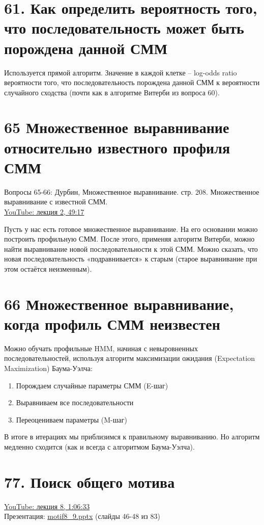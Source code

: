 \documentclass[a4paper,12pt]{article} %
\begin{document}
\section{61. Как определить вероятность того, что последовательность может быть порождена данной СММ}
Используется прямой алгоритм. Значение в каждой клетке -- log-odds ratio вероятности того, что последовательность порождена данной СММ к вероятности случайного сходства (почти как в алгоритме Витерби из вопроса 60).


\section{65 Множественное выравнивание относительно известного профиля СММ}

Вопросы 65-66: Дурбин,  Множественное выравнивание. стр. 208. Множественное выравнивание с известной СММ.\\
\href{https://youtu.be/HD_VI41SmV4?t=2957}{YouTube: лекция 2, 49:17}


Пусть у нас есть готовое множественное выравнивание. На его основании можно построить профильную СММ. После этого, применяя алгоритм Витерби, можно найти выравнивание новой последовательности к этой СММ. Можно сказать, что новая последовательность «подравнивается» к старым (старое выравнивание при этом остаётся неизменным).

\section{66 Множественное выравнивание, когда профиль СММ неизвестен}

Можно обучать профильные HMM, начиная с невыровненных последовательностей, используя алгоритм максимизации ожидания (Expectation Maximization) Баума-Уэлча:
\begin{enumerate}
	\item Порождаем случайные параметры СММ (E-шаг)
	\item Выравниваем все последовательности
	\item Переоцениваем параметры (M-шаг)
\end{enumerate}

В итоге в итерациях мы приблизимся к правильному выравниванию. Но алгоритм медленно сходится (как и всегда с алгоритмом Баума-Уэлча).

\section{77. Поиск общего мотива}
\href{https://www.youtube.com/watch?v=zR9ZRMmMdY0&list=PLvJPYisgz4MDD0mcjf9HBu9OX-gb-7WZc&t=3993s}{YouTube: лекция 8, 1:06:33}\\
Презентация: \href{https://vk.com/doc155237002_582644476?hash=d8a8032e4fcc7c9f4d}{motif8\_9.pptx} (слайды 46-48 из 83)
\end{document}
